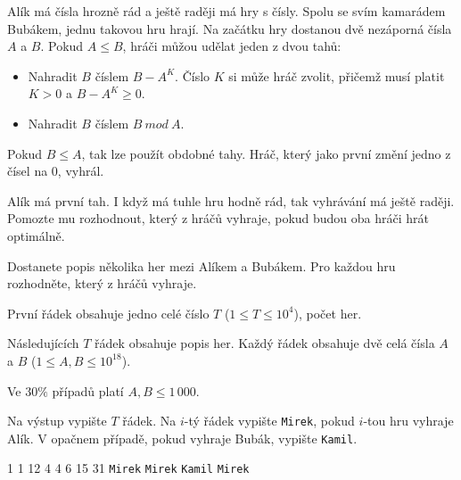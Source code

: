 





Alík má čísla hrozně rád a ještě raději má hry s čísly.
Spolu se svím kamarádem Bubákem, jednu takovou hru hrají.
Na začátku hry dostanou dvě nezáporná čísla $A$ a $B$.
Pokud $A \leqslant B$, hráči můžou udělat jeden z dvou tahů:

\begin{itemize}
    \item Nahradit $B$ číslem $B - A^K$. Číslo $K$ si může hráč zvolit, přičemž musí platit $K > 0$ a $B - A^K \ge 0$.
    \item Nahradit $B$ číslem $B\ mod\ A$.
\end{itemize}

Pokud $B \leqslant A$, tak lze použít obdobné tahy.
Hráč, který jako první změní jedno z čísel na $0$, vyhrál.

Alík má první tah. I když má tuhle hru hodně rád, tak vyhrávání má ještě raději.
Pomozte mu rozhodnout, který z hráčů vyhraje, pokud budou oba hráči hrát optimálně.


Dostanete popis několika her mezi Alíkem a Bubákem.
Pro každou hru rozhodněte, který z hráčů vyhraje.


První řádek obsahuje jedno celé číslo $T$ ($1 \le T \le 10^4$), počet her.

Následujících $T$ řádek obsahuje popis her. Každý řádek obsahuje dvě celá čísla $A$ a $B$ ($1 \le A, B \le 10^{18}$).

\smallskip

Ve $30\%$ případů platí $A,B \le 1\,000$.


Na výstup vypište $T$ řádek.
Na $i$-tý řádek vypište \texttt{Mirek}, pokud $i$-tou hru vyhraje Alík. V opačnem případě, pokud vyhraje Bubák, vypište \texttt{Kamil}.


1 1
12 4
4 6
15 31
\sampleOUT
\texttt{Mirek}
\texttt{Mirek}
\texttt{Kamil}
\texttt{Mirek}
\sampleEND


